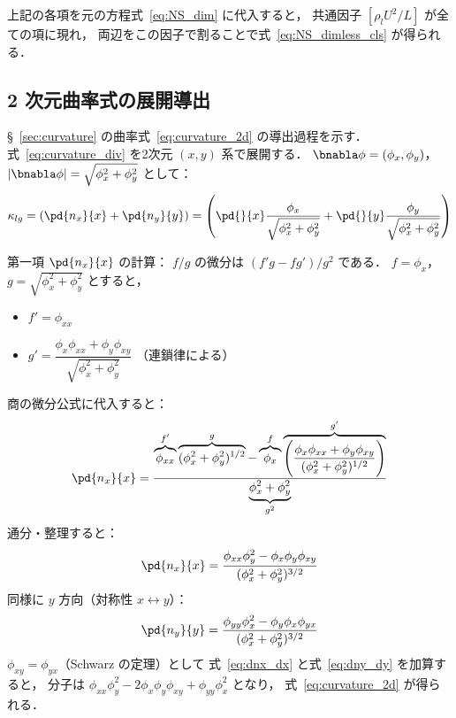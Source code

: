 上記の各項を元の方程式~\eqref{eq:NS_dim} に代入すると，
共通因子 $[\rho_l U^2/L]$ が全ての項に現れ，
両辺をこの因子で割ることで式~\eqref{eq:NS_dimless_cls} が得られる．

\subsection{2 次元曲率式の展開導出}
\label{app:curvature_2d_derivation}

§~\ref{sec:curvature} の曲率式~\eqref{eq:curvature_2d} の導出過程を示す．
式~\eqref{eq:curvature_div} を2次元 $(x,y)$ 系で展開する．
$\bnabla\phi = (\phi_x, \phi_y)$，
$|\bnabla\phi| = \sqrt{\phi_x^2 + \phi_y^2}$ として：
\[
  \kappa_{lg} = \left( \pd{n_x}{x} + \pd{n_y}{y} \right)
  = \left(
      \pd{}{x}\frac{\phi_x}{\sqrt{\phi_x^2+\phi_y^2}}
      + \pd{}{y}\frac{\phi_y}{\sqrt{\phi_x^2+\phi_y^2}}
    \right)
\]

第一項 $\pd{n_x}{x}$ の計算：
$f/g$ の微分は $(f'g - fg')/g^2$ である．
$f=\phi_x$，$g=\sqrt{\phi_x^2+\phi_y^2}$ とすると，
\begin{itemize}
    \item $f' = \phi_{xx}$
    \item $g' = \dfrac{\phi_x\phi_{xx} + \phi_y\phi_{xy}}{\sqrt{\phi_x^2+\phi_y^2}}$
    \quad（連鎖律による）
\end{itemize}
商の微分公式に代入すると：
\begin{equation}
 \pd{n_x}{x}
 = \frac{
     \overbrace{\phi_{xx}}^{f'}
     \overbrace{(\phi_x^2+\phi_y^2)^{1/2}}^{g}
     -
     \overbrace{\phi_x}^{f}
     \overbrace{\left(\dfrac{\phi_x\phi_{xx} + \phi_y\phi_{xy}}{(\phi_x^2+\phi_y^2)^{1/2}}\right)}^{g'}
   }{\underbrace{\phi_x^2+\phi_y^2}_{g^2}}
 \label{eq:dnx_dx_raw}
\end{equation}
通分・整理すると：
\begin{equation}
 \pd{n_x}{x}
 = \frac{\phi_{xx}\phi_y^2 - \phi_x\phi_y\phi_{xy}}{(\phi_x^2+\phi_y^2)^{3/2}}
 \label{eq:dnx_dx}
\end{equation}
同様に $y$ 方向（対称性 $x \leftrightarrow y$）：
\begin{equation}
  \pd{n_y}{y}
  = \frac{\phi_{yy}\phi_x^2 - \phi_y\phi_x\phi_{yx}}{(\phi_x^2+\phi_y^2)^{3/2}}
  \label{eq:dny_dy}
\end{equation}
$\phi_{xy}=\phi_{yx}$（Schwarz の定理）として
式~\eqref{eq:dnx_dx} と式~\eqref{eq:dny_dy} を加算すると，
分子は $\phi_{xx}\phi_y^2 - 2\phi_x\phi_y\phi_{xy} + \phi_{yy}\phi_x^2$ となり，
式~\eqref{eq:curvature_2d} が得られる．

